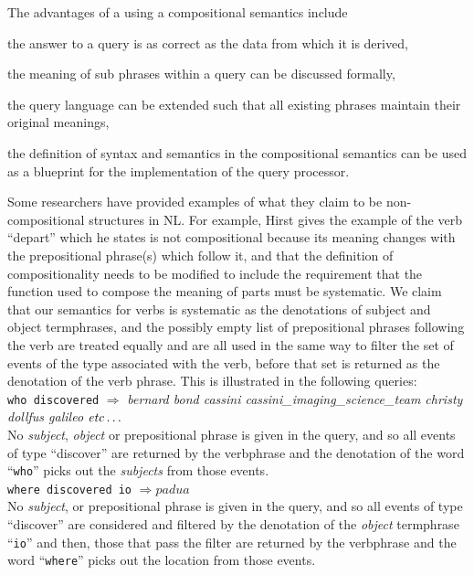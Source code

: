 \documentclass[../main.tex]{subfiles}
\begin{document}
\begin{refsection}
The advantages of a using a compositional semantics include
\begin{inparaenum}[1)]
	\item the answer to a query is as correct as the data from which it is derived,
	\item  the meaning of sub phrases within a query can be discussed formally,
	\item the query language can be extended such that all existing phrases maintain their original meanings,
	\item the definition of syntax and semantics in the compositional semantics can be used as a blueprint for the implementation of the query processor.
\end{inparaenum}

Some researchers have provided examples of what they claim to be non-compositional structures in NL. For example, Hirst \cite{hirst1992semantic} gives the example of the verb ``depart'' which he states is not compositional because its meaning changes with the prepositional phrase(s) which follow it, and that the definition of compositionality needs to be modified to include the requirement that the function used to compose the meaning of parts must be systematic. We claim that our semantics for verbs is systematic as the denotations of subject and object termphrases, and the possibly empty list of prepositional phrases following the verb are treated equally and are all used in the same way to filter the set of events of the type associated with the verb, before that set is returned as the denotation of the verb phrase. This is illustrated in the following queries: \\

\noindent \texttt{who discovered} $\Rightarrow$ \textit{bernard bond cassini cassini\_imaging\_science\_team christy dollfus galileo} $\mathit{etc}\ldots$ \\

No \textit{subject}, \textit{object} or prepositional phrase is given in the query, and so all events of type ``discover'' are returned by the verbphrase and the denotation of the word ``\texttt{who}'' picks out the \textit{subjects} from those events. \\

\noindent \texttt{where discovered io} $\Rightarrow \mathit{padua}$ \\

No \textit{subject}, or prepositional phrase is given in the query, and so all events of type ``discover'' are considered and filtered by the denotation of the \textit{object} termphrase ``\texttt{io}'' and then, those that pass the filter are returned by the verbphrase and the word ``\texttt{where}'' picks out the location from those events. \\ %


\end{refsection}
\end{document}
